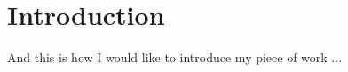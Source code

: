 \chapter{Introduction}
\ifpdf
    \graphicspath{{Introduction/IntroductionFigs/PNG/}{Introduction/IntroductionFigs/PDF/}{Introduction/IntroductionFigs/}}
\else
    \graphicspath{{Introduction/IntroductionFigs/EPS/}{Introduction/IntroductionFigs/}}
\fi

And this is how I would like to introduce my piece of work ...




